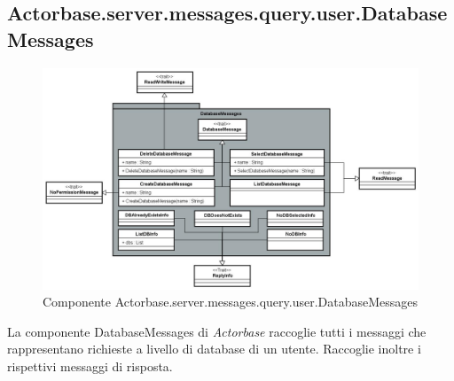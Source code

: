 \documentclass[a4paper]{article}
\begin{document}
	\subsection{Actorbase.server.messages.query.user.DatabaseMessages}
		\begin{figure}[H]
			\centering
			\includegraphics[scale=0.35]{Server/databaseMessagesLevel.jpg}
			\caption{Componente Actorbase.server.messages.query.user.DatabaseMessages}
		\end{figure}
		La componente DatabaseMessages di \emph{Actorbase} raccoglie tutti i messaggi che rappresentano richieste a livello di database di un utente. Raccoglie inoltre i rispettivi messaggi di risposta.
		
\end{document}
